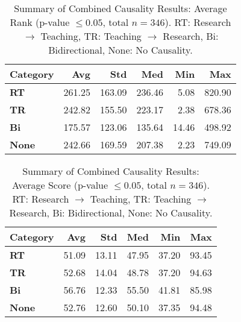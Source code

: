 \documentclass[conference]{IEEEtran}
\begin{document}
\begin{table}
	\centering
	\caption{Summary of Combined Causality Results: Average Rank (p-value $\leq 0.05$, total $n=346$). RT: Research $\rightarrow$ Teaching, TR: Teaching $\rightarrow$ Research, Bi: Bidirectional, None: No Causality.}
	\label{tab:category_average}
		\begin{tabular}{|l|r|r|r|r|r|}
			\hline
			\textbf{Category} & \textbf{Avg} & \textbf{Std} & \textbf{Med} & \textbf{Min} & \textbf{Max} \\ \hline
			\textbf{RT}           & 261.25  & 163.09  & 236.46  & 5.08    & 820.90  \\ \hline
			\textbf{TR}           & 242.82  & 155.50  & 223.17  & 2.38    & 678.36  \\ \hline
			\textbf{Bi}           & 175.57  & 123.06  & 135.64  & 14.46   & 498.92  \\ \hline
			\textbf{None}         & 242.66  & 169.59  & 207.38  & 2.23    & 749.09  \\ \hline
		\end{tabular}
\end{table}

\begin{table}
	\centering
	\caption{Summary of Combined Causality Results: Average Score (p-value $\leq 0.05$, total $n=346$). RT: Research $\rightarrow$ Teaching, TR: Teaching $\rightarrow$ Research, Bi: Bidirectional, None: No Causality.}
		\label{tab:category_score}
		\begin{tabular}{|l|r|r|r|r|r|}
			\hline
			\textbf{Category} & \textbf{Avg} & \textbf{Std} & \textbf{Med} & \textbf{Min} & \textbf{Max} \\ \hline
			\textbf{RT}           & 51.09  & 13.11  & 47.95  & 37.20  & 93.45  \\ \hline
			\textbf{TR}           & 52.68  & 14.04  & 48.78  & 37.20  & 94.63  \\ \hline
			\textbf{Bi}           & 56.76  & 12.33  & 55.50  & 41.81  & 85.98  \\ \hline
			\textbf{None}         & 52.76  & 12.60  & 50.10  & 37.35  & 94.48  \\ \hline
		\end{tabular}
\end{table}
\end{document}
